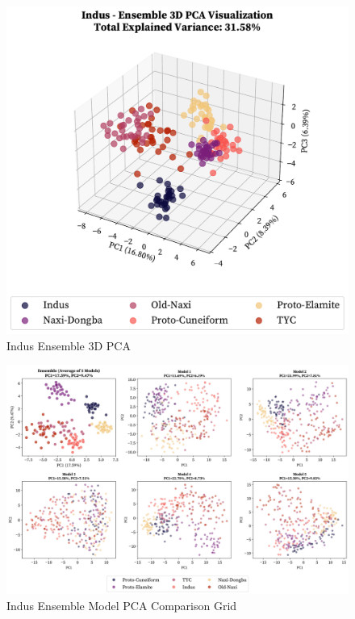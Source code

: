 \documentclass[11pt,a4paper,oneside]{report}
\begin{document}
\begin{figure}[H] 
    \centering
    \includegraphics[width=0.8\linewidth]{Visualizations/PCA/Indus/ensemble_pca_3d.pdf}
     \caption*{Indus Ensemble 3D PCA}
\end{figure}

\begin{figure}[H] 
    \centering
    \includegraphics[width=1\linewidth]{Visualizations/PCA/Indus/model_comparison_grid_pca.pdf}
     \caption*{Indus Ensemble Model PCA Comparison Grid}
\end{figure}
\end{document}
